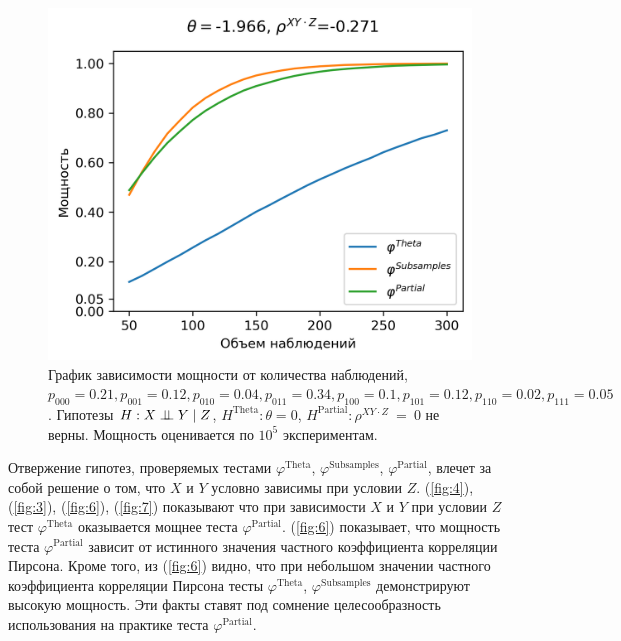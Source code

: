 \begin{figure}[H]
    \centering
    \includegraphics[scale=0.65]{images/graph7.png}
    \caption{График зависимости мощности от количества наблюдений,
    $p_{000}=0.21, p_{001}=0.12, 
    p_{010}=0.04, p_{011}=0.34,
    p_{100}=0.1, p_{101}=0.12, p_{110}=0.02, p_{111}=0.05$. 
    Гипотезы $H: X \perp\!\!\!\perp Y \mid Z$,
    $H^{\text{Theta}}: \theta=0$, 
    $H^{\text{Partial}}: \rho^{XY\cdot Z}~=~0$
    не верны.
    Мощность оценивается по $10^5$ экспериментам.} \label{fig:7}
\end{figure}

Отвержение гипотез, проверяемых  тестами 
$\varphi^{\text{Theta}}$,
$\varphi^{\text{Subsamples}}$,
$\varphi^{\text{Partial}}$, влечет за собой решение о том, что
$X$ и $Y$ условно зависимы при условии $Z$.
(\autoref{fig:4}), 
(\autoref{fig:3}), (\autoref{fig:6}), (\autoref{fig:7})
показывают что при зависимости 
$X$ и $Y$ при условии $Z$ тест $\varphi^{\text{Theta}}$
оказывается мощнее теста $\varphi^{\text{Partial}}$.
(\autoref{fig:6}) показывает, что
мощность теста $\varphi^{\text{Partial}}$ зависит от истинного
значения частного коэффициента корреляции Пирсона. Кроме того, из (\autoref{fig:6})
видно, что при небольшом значении частного коэффициента корреляции
Пирсона тесты $\varphi^{\text{Theta}}$,
$\varphi^{\text{Subsamples}}$ демонстрируют высокую мощность.
Эти факты ставят под сомнение целесообразность использования 
на практике теста $\varphi^{\text{Partial}}$.

